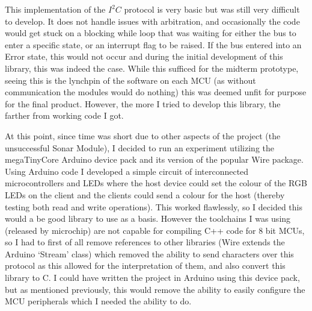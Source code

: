 \documentclass[11pt,a4paper,titlepage]{report}
\begin{document}
	 This implementation of the $I^{2}C$ protocol is very basic but was still very difficult to develop. It does not handle issues with arbitration, and occasionally the code would get stuck on a blocking while loop that was waiting for either the bus to enter a specific state, or an interrupt flag to be raised. If the bus entered into an Error state, this would not occur and during the initial development of this library, this was indeed the case. While this sufficed for the midterm prototype, seeing this is the lynchpin of the software on each MCU (as without communication the modules would do nothing) this was deemed unfit for purpose for the final product. However, the more I tried to develop this library, the farther from working code I got. 
	 
	 At this point, since time was short due to other aspects of the project (the unsuccessful Sonar Module), I decided to run an experiment utilizing the megaTinyCore\cite{MEGATINYCORE} Arduino device pack and its version of the popular Wire package\cite{MEGATINYCORE_WIRE}. Using Arduino code I developed a simple circuit of interconnected microcontrollers and LEDs where the host device could set the colour of the RGB LEDs on the client and the clients could send a colour for the host (thereby testing both read and write operations). This worked flawlessly, so I decided this would a be good library to use as a basis. However the toolchains I was using (released by microchip) are not capable for compiling C++ code for 8 bit MCUs, so I had to first of all remove references to other libraries (Wire extends the Arduino `Stream' class) which removed the ability to send characters over this protocol as this allowed for the interpretation of them, and also convert this library to C. I could have written the project in Arduino using this device pack, but as mentioned previously, this would remove the ability to easily configure the MCU peripherals which I needed the ability to do.
	 
\end{document}
